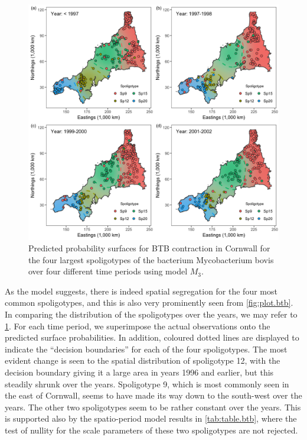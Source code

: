 \documentclass[a4paper,showframe,11pt]{report}\usepackage[]{graphicx}\usepackage[]{color}
\newenvironment{knitrout}{}{} %
\begin{document}
\begin{knitrout}
\color{fgcolor}\begin{figure}[p]

{\centering \includegraphics[width=\linewidth]{figure/05-plot_temporal_btb-1} 

}

\caption[Predicted probability surfaces for BTB contraction in Cornwall for the four largest spoligotypes of the bacterium Mycobacterium bovis over four different time periods using model $M_3$]{Predicted probability surfaces for BTB contraction in Cornwall for the four largest spoligotypes of the bacterium Mycobacterium bovis over four different time periods using model $M_3$.}\label{fig:plot.temporal.btb}
\end{figure}


\end{knitrout}
\vspace{-1em}
As the model suggests, there is indeed spatial segregation for the four most common spoligotypes, and this is also very prominently seen from \cref{fig:plot.btb}.
In comparing the distribution of the spoligotypes over the years, we may refer to \cref{fig:plot.temporal.btb}.
For each time period, we superimpose the actual observations onto the predicted surface probabilities.
In addition, coloured dotted lines are displayed to indicate the ``decision boundaries'' for each of the four spoligotypes.
The most evident change is seen to the spatial distribution of spoligotype 12, with the decision boundary giving it a large area in years 1996 and earlier, but this steadily shrunk over the years.
Spoligotype 9, which is most commonly seen in the east of Cornwall, seems to have made its way down to the south-west over the years.
The other two spoligotypes seem to be rather constant over the years.
This is supported also by the spatio-period model results in \cref{tab:table.btb}, where the test of nullity for the scale parameters of these two spoligotypes are not rejected.
\end{document}
